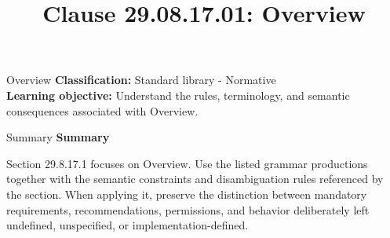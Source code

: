 \documentclass[10pt,letterpaper]{article}
\title{Clause 29.08.17.01: Overview}
\author{}
\date{}
\begin{document}
\maketitle
\begin{CornellOverviewBox}{Overview}
\textbf{Classification:} Standard library - Normative\\[2pt]
\textbf{Learning objective:} Understand the rules, terminology, and semantic consequences associated with Overview.
\end{CornellOverviewBox}\begin{CornellSummaryBox}{Summary}
{\sffamily\bfseries\color{Accent} Summary}\par\vspace{3pt}Section 29.8.17.1 focuses on Overview. Use the listed grammar productions together with the semantic constraints and disambiguation rules referenced by the section. When applying it, preserve the distinction between mandatory requirements, recommendations, permissions, and behavior deliberately left undefined, unspecified, or implementation-defined.
\end{CornellSummaryBox}
\end{document}
